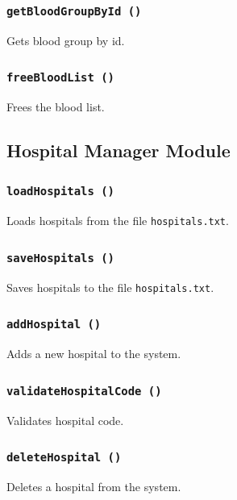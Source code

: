 \documentclass[12pt,a4paper]{report}
\begin{document}
\subsubsection{\texttt{getBloodGroupById ()}}
Gets blood group by id.


\subsubsection{\texttt{freeBloodList ()}}
Frees the blood list.


\subsection{Hospital Manager Module}
\subsubsection{\texttt{loadHospitals ()}}
Loads hospitals from the file \texttt{hospitals.txt}.


\subsubsection{\texttt{saveHospitals ()}}
Saves hospitals to the file \texttt{hospitals.txt}.


\subsubsection{\texttt{addHospital ()}}
Adds a new hospital to the system.


\subsubsection{\texttt{validateHospitalCode ()}}
Validates hospital code.


\subsubsection{\texttt{deleteHospital ()}}
Deletes a hospital from the system.

\end{document}
